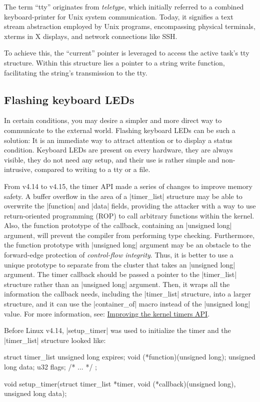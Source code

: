 \documentclass[10pt, oneside]{book}
\begin{document}
The term ``tty'' originates from \emph{teletype}, which initially referred to a combined keyboard-printer for Unix system communication.
Today, it signifies a text stream abstraction employed by Unix programs, encompassing physical terminals,
xterms in X displays, and network connections like SSH.

To achieve this, the ``current'' pointer is leveraged to access the active task's tty structure.
Within this structure lies a pointer to a string write function, facilitating the string's transmission to the tty.


\subsection{Flashing keyboard LEDs}
\label{sec:flash_kb_led}
In certain conditions, you may desire a simpler and more direct way to communicate to the external world.
Flashing keyboard LEDs can be such a solution: It is an immediate way to attract attention or to display a status condition.
Keyboard LEDs are present on every hardware, they are always visible, they do not need any setup, and their use is rather simple and non-intrusive, compared to writing to a tty or a file.

From v4.14 to v4.15, the timer API made a series of changes to improve memory safety.
A buffer overflow in the area of a \cpp|timer_list| structure may be able to overwrite the \cpp|function| and \cpp|data| fields, providing the attacker with a way to use return-oriented programming (ROP) to call arbitrary functions within the kernel.
Also, the function prototype of the callback, containing an \cpp|unsigned long| argument, will prevent the compiler from performing type checking.
Furthermore, the function prototype with \cpp|unsigned long| argument may be an obstacle to the forward-edge protection of \textit{control-flow integrity}.
Thus, it is better to use a unique prototype to separate from the cluster that takes an \cpp|unsigned long| argument.
The timer callback should be passed a pointer to the \cpp|timer_list| structure rather than an \cpp|unsigned long| argument.
Then, it wraps all the information the callback needs, including the \cpp|timer_list| structure, into a larger structure, and it can use the \cpp|container_of| macro instead of the \cpp|unsigned long| value.
For more information, see: \href{https://lwn.net/Articles/735887/}{Improving the kernel timers API}.

Before Linux v4.14, \cpp|setup_timer| was used to initialize the timer and the \cpp|timer_list| structure looked like:
\begin{code}
struct timer_list {
    unsigned long expires;
    void (*function)(unsigned long);
    unsigned long data;
    u32 flags;
    /* ... */
};

void setup_timer(struct timer_list *timer, void (*callback)(unsigned long),
                 unsigned long data);
\end{code}
\end{document}
